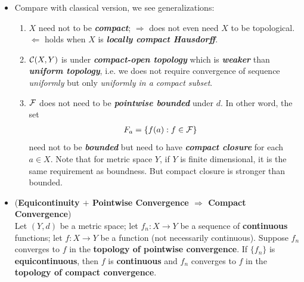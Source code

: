 \documentclass[11pt]{article}
\begin{document}
\begin{itemize}
\item \begin{remark} 
Compare with classical version, we see generalizations:
\begin{enumerate}
\item $X$ need not to be \emph{\textbf{compact}}; $\Rightarrow$ does not even need $X$ to be topological. $\Leftarrow$ holds when $X$ is \textbf{\emph{locally compact Hausdorff}}.
\item ${\mathcal C}(X, Y)$ is under \emph{\textbf{compact-open topology}} which is \emph{\textbf{weaker}} than \emph{\textbf{uniform topology}}, i.e. we does not require convergence of sequence \emph{uniformly} but only \emph{uniformly in a compact subset}.
\item ${\mathcal F}$ does not need to be \emph{\textbf{pointwise bounded}} under $d$. In other word, the set 
\begin{align*}
F_{a} &= \left\{f(a): f \in {\mathcal F}\right\}
\end{align*} need not to be \emph{\textbf{bounded}} but need to have \emph{\textbf{compact closure}} for each $a \in X$. Note that for metric space $Y$, if $Y$ is finite dimensional, it is the same requirement as boundness. But compact closure is stronger than bounded.
\end{enumerate}
\end{remark}

\item \begin{proposition} (\textbf{Equicontinuity $+$ Pointwise Convergence $\Rightarrow$ Compact Convergence}) \citep{munkres2000topology}\\
Let $(Y, d)$ be a metric space; let $f_n : X \rightarrow Y$ be a sequence of \textbf{continuous} functions; let $f : X \rightarrow Y$ be a function (not necessarily continuous). Suppose $f_n$ converges to $f$ in the \textbf{topology of pointwise convergence}. If $\{f_n\}$ is \textbf{equicontinuous}, then $f$ is \textbf{continuous} and $f_n$ converges to $f$ in the \textbf{topology of compact convergence}.
\end{proposition}
\end{itemize}
\end{document}
